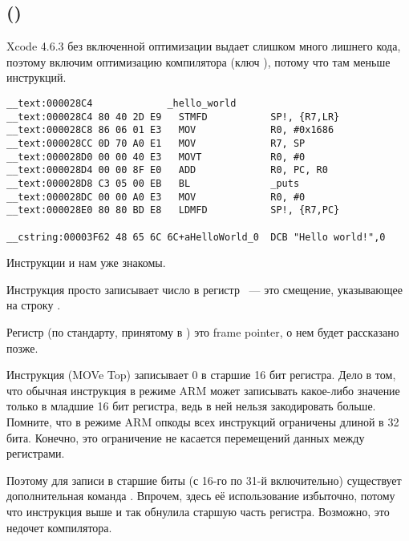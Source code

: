 \subsection{\OptimizingXcodeIV (\ARMMode)}

Xcode 4.6.3 без включенной оптимизации выдает слишком много лишнего кода, поэтому включим оптимизацию компилятора (ключ \Othree), потому что там меньше инструкций.

\begin{lstlisting}[caption=\OptimizingXcodeIV (\ARMMode)]
__text:000028C4             _hello_world
__text:000028C4 80 40 2D E9   STMFD           SP!, {R7,LR}
__text:000028C8 86 06 01 E3   MOV             R0, #0x1686
__text:000028CC 0D 70 A0 E1   MOV             R7, SP
__text:000028D0 00 00 40 E3   MOVT            R0, #0
__text:000028D4 00 00 8F E0   ADD             R0, PC, R0
__text:000028D8 C3 05 00 EB   BL              _puts
__text:000028DC 00 00 A0 E3   MOV             R0, #0
__text:000028E0 80 80 BD E8   LDMFD           SP!, {R7,PC}

__cstring:00003F62 48 65 6C 6C+aHelloWorld_0  DCB "Hello world!",0
\end{lstlisting}

Инструкции  и  нам уже знакомы.

Инструкция \MOV просто записывает число  в регистр ~--- это смещение, указывающее на строку .

Регистр  (по стандарту, принятому в \IOSABI) это frame pointer, о нем будет рассказано позже.

Инструкция  (MOVe Top) записывает 0 в старшие 16 бит регистра.
Дело в том, что обычная инструкция \MOV в режиме ARM может записывать какое-либо значение только в младшие 16 бит регистра, ведь в ней нельзя закодировать больше.
Помните, что в режиме ARM опкоды всех инструкций ограничены длиной в 32 бита. Конечно, это ограничение не касается перемещений данных между регистрами.

Поэтому для записи в старшие биты (с 16-го по 31-й включительно) существует дополнительная команда .
Впрочем, здесь её использование избыточно, потому что инструкция  выше и так обнулила старшую часть регистра.
Возможно, это недочет компилятора.

